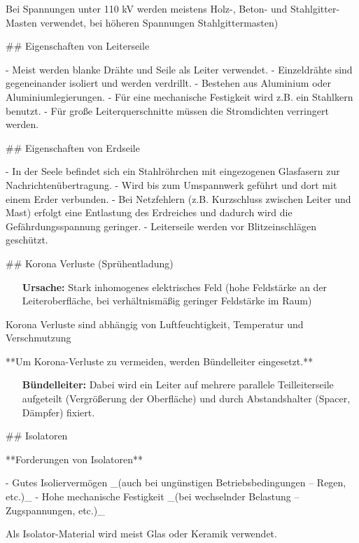 \begin{markdown}

Bei Spannungen unter 110 kV werden meistens Holz-, Beton- und Stahlgitter-Masten verwendet, bei höheren Spannungen Stahlgittermasten)

## Eigenschaften von Leiterseile

- Meist werden blanke Drähte und Seile als Leiter verwendet.
- Einzeldrähte sind gegeneinander isoliert und werden verdrillt.
- Bestehen aus Aluminium oder Aluminiumlegierungen.
- Für eine mechanische Festigkeit wird z.B. ein Stahlkern benutzt.
- Für große Leiterquerschnitte müssen die Stromdichten verringert werden.

## Eigenschaften von Erdseile

- In der Seele befindet sich ein Stahlröhrchen mit eingezogenen Glasfasern zur Nachrichtenübertragung.
- Wird bis zum Umspannwerk geführt und dort mit einem Erder verbunden.
- Bei Netzfehlern (z.B. Kurzschluss zwischen Leiter und Mast) erfolgt eine Entlastung des Erdreiches und dadurch wird die Gefährdungsspannung geringer.
- Leiterseile werden vor Blitzeinschlägen geschützt.

## Korona Verluste (Sprühentladung)


\begin{itemize}
    \item[\textbf{Ursache:}] Stark inhomogenes elektrisches Feld (hohe Feldstärke an der Leiteroberfläche, bei verhältnismäßig geringer Feldstärke im Raum)
\end{itemize}

Korona Verluste sind abhängig von Luftfeuchtigkeit, Temperatur und
Verschmutzung

**Um Korona-Verluste zu vermeiden, werden Bündelleiter eingesetzt.**

\vspace*{1em}

\begin{itemize}
    \item[\textbf{Bündelleiter:}] Dabei wird ein Leiter auf mehrere parallele Teilleiterseile aufgeteilt (Vergrößerung der Oberfläche) und durch Abstandshalter (Spacer, Dämpfer) fixiert.
\end{itemize}

## Isolatoren


**Forderungen von Isolatoren**

- Gutes Isoliervermögen _(auch bei ungünstigen Betriebsbedingungen – Regen, etc.)_
- Hohe mechanische Festigkeit _(bei wechselnder Belastung – Zugspannungen, etc.)_

Als Isolator-Material wird meist Glas oder Keramik verwendet.

\end{markdown}